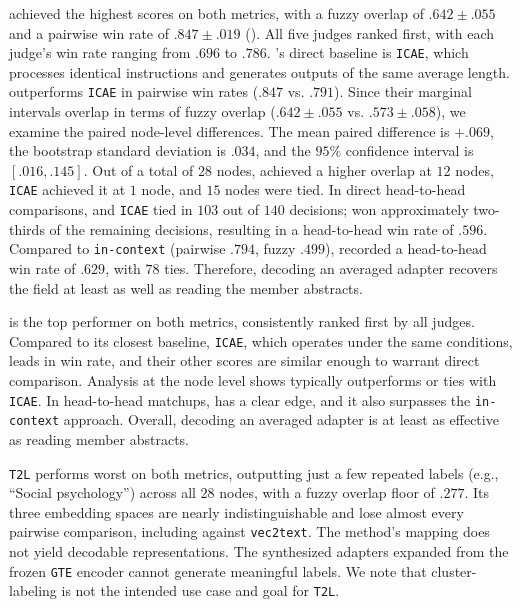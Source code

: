 \doctolora achieved the highest scores on both metrics, with a fuzzy overlap of $.642 \pm .055$ and a pairwise win rate of $.847 \pm .019$ ().
All five judges ranked \doctolora first, with each judge’s win rate ranging from $.696$ to $.786$.
\doctolora’s direct baseline is \texttt{ICAE}, which processes identical instructions and generates outputs of the same average length.
\doctolora outperforms \texttt{ICAE} in pairwise win rates ($.847$ vs. $.791$).
Since their marginal intervals overlap in terms of fuzzy overlap ($.642 \pm .055$ vs. $.573 \pm .058$), we examine the paired node-level differences.
The mean paired difference is $+.069$, the bootstrap standard deviation is $.034$, and the $95\%$ confidence interval is $[.016, .145]$.
Out of a total of $28$ nodes, \doctolora achieved a higher overlap at $12$ nodes, \texttt{ICAE} achieved it at $1$ node, and $15$ nodes were tied.
In direct head-to-head comparisons, \doctolora and \texttt{ICAE} tied in $103$ out of $140$ decisions; \doctolora won approximately two-thirds of the remaining decisions, resulting in a head-to-head win rate of $.596$.
Compared to \texttt{in-context} (pairwise $.794$, fuzzy $.499$), \doctolora recorded a head-to-head win rate of $.629$, with $78$ ties.
Therefore, decoding an averaged adapter recovers the field at least as well as reading the member abstracts.

\doctolora is the top performer on both metrics, consistently ranked first by all judges. 
Compared to its closest baseline, \texttt{ICAE}, which operates under the same conditions, \doctolora leads in win rate, and their other scores are similar enough to warrant direct comparison. Analysis at the node level shows \doctolora typically outperforms or ties with \texttt{ICAE}. 
In head-to-head matchups, \doctolora has a clear edge, and it also surpasses the \texttt{in-context} approach. 
Overall, decoding an averaged adapter is at least as effective as reading member abstracts.

\texttt{T2L} performs worst on both metrics, outputting just a few repeated labels (e.g., ``Social psychology'') across all $28$ nodes, with a fuzzy overlap floor of $.277$. Its three embedding spaces are nearly indistinguishable and lose almost every pairwise comparison, including against \texttt{vec2text}. The method's mapping does not yield decodable representations. The synthesized adapters expanded from the frozen \texttt{GTE} encoder cannot generate meaningful labels. We note that cluster-labeling is not the intended use case and goal for \texttt{T2L}.

